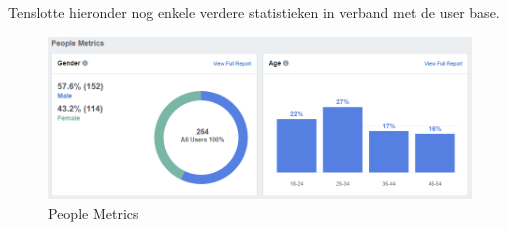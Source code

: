 \documentclass[11pt, letterpaper, oneside]{article}
\begin{document}
	Tenslotte hieronder nog enkele verdere statistieken in verband met de user base.
	
	\begin{figure}[h]
		\centering
		\includegraphics[width=0.7\linewidth]{./figuren/people-metrics}
		\caption{People Metrics}
		\label{people-metrics}
	\end{figure}
	
\end{document}
